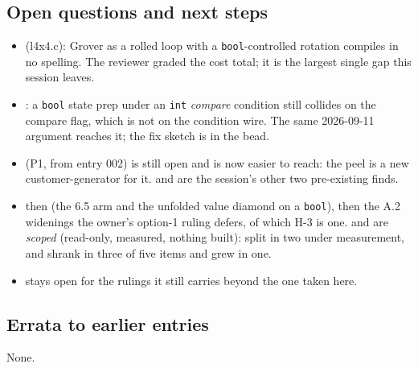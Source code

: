 \subsection*{Open questions and next steps}
\begin{itemize}
  \item {} (l4x4.c): Grover as a rolled loop with a \texttt{bool}-controlled rotation compiles in
    no spelling. The reviewer graded the cost total; it is the largest single gap this session leaves.
  \item {}: a \texttt{bool} state prep under an \texttt{int} \emph{compare} condition still
    collides on the compare flag, which is not on the condition wire. The same 2026-09-11 argument reaches
    it; the fix sketch is in the bead.
  \item {} (P1, from entry 002) is still open and is now easier to reach: the peel is a new
    customer-generator for it.  and  are the session's other two pre-existing finds.
  \item {} then  (the 6.5 arm and the unfolded value diamond on a \texttt{bool}), then the
    A.2 widenings the owner's option-1 ruling defers, of which H-3 is one.  and  are
    \emph{scoped} (read-only, measured, nothing built):  split in two under measurement, and
     shrank in three of five items and grew in one.
  \item {} stays open for the rulings it still carries beyond the one taken here.
\end{itemize}

\subsection*{Errata to earlier entries}
None.
